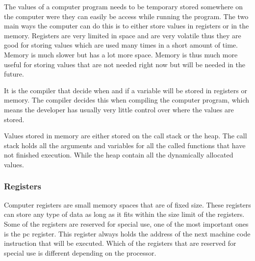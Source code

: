  

The values of a computer program needs to be temporary stored somewhere on the computer were they can easily be access while running the program.
The two main ways the computer can do this is to either store values in registers or in the memory.
Registers are very limited in space and are very volatile thus they are good for storing values which are used many times in a short amount of time.
Memory is much slower but has a lot more space.
Memory is thus much more useful for storing values that are not needed right now but will be needed in the future.


It is the compiler that decide when and if a variable will be stored in registers or memory.
The compiler decides this when compiling the computer program, which means the developer has usually very little control over where the values are stored.


Values stored in memory are either stored on the call stack or the heap.
The call stack holds all the arguments and variables for all the called functions that have not finished execution.
While the heap contain all the dynamically allocated values.


\subsubsection{Registers}
Computer registers are small memory spaces that are of fixed size.
These registers can store any type of data as long as it fits within the size limit of the registers.
Some of the registers are reserved for special use, one of the most important ones is the \acrfull{pc} register.
This register always holds the address of the next machine code instruction that will be executed.
Which of the registers that are reserved for special use is different depending on the processor.


